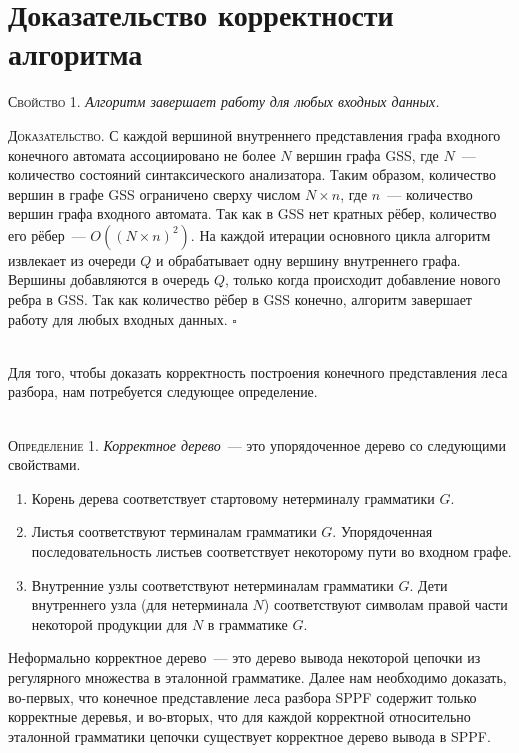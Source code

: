 \section{Доказательство корректности алгоритма}
\textsc{Свойство 1.} 
\textit{Алгоритм завершает работу для любых входных данных.}

\textsc{Доказательство.}
С каждой вершиной внутреннего представления графа входного конечного автомата ассоциировано не более $N$ вершин графа GSS, где $N$~--- количество состояний синтаксического анализатора. Таким образом, количество вершин в графе GSS ограничено сверху числом $N \times n$, где $n$~--- количество вершин графа входного автомата. Так как в GSS нет кратных рёбер, количество его рёбер~--- $O((N \times n)^{2})$. На каждой итерации основного цикла алгоритм извлекает из очереди $Q$ и обрабатывает одну вершину внутреннего графа. Вершины добавляются в очередь $Q$, только когда происходит добавление нового ребра в GSS. Так как количество рёбер в GSS конечно, алгоритм завершает работу для любых входных данных. $\square$~\\~

Для того, чтобы доказать корректность построения конечного представления леса 
разбора, нам потребуется следующее определение.~\\~

\textsc{Определение 1.} 
\emph{Корректное дерево}~--- это упорядоченное дерево со следующими свойствами.
\begin{enumerate}
  \item Корень дерева соответствует стартовому нетерминалу грамматики $G$.
  \item Листья соответствуют терминалам грамматики $G$. Упорядоченная последовательность листьев соответствует некоторому пути во входном графе.
  \item Внутренние узлы соответствуют нетерминалам грамматики $G$. Дети внутреннего узла (для нетерминала $N$) соответствуют символам правой части некоторой продукции для $N$ в грамматике $G$.
\end{enumerate}

Неформально корректное дерево~--- это дерево вывода некоторой цепочки из 
регулярного множества в эталонной грамматике. Далее нам необходимо доказать, 
во-первых, что конечное представление леса разбора SPPF содержит только 
корректные деревья, и во-вторых, что для каждой корректной относительно 
эталонной грамматики цепочки существует корректное дерево вывода в SPPF.~\\~

